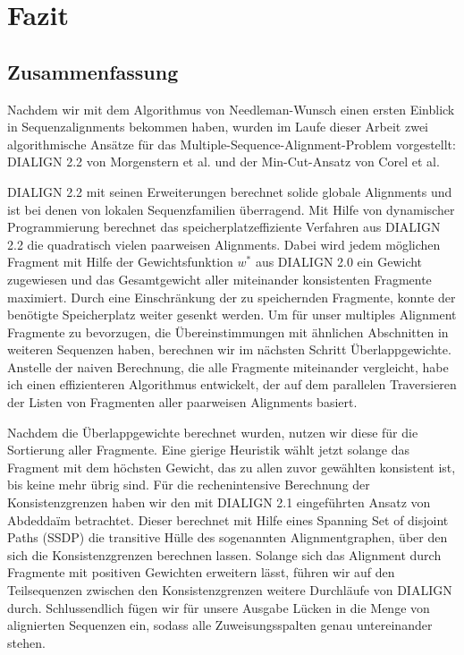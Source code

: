 \chapter{Fazit}
\label{ch:fazit}

\section{Zusammenfassung}

Nachdem wir mit dem Algorithmus von Needleman-Wunsch einen ersten Einblick in Sequenzalignments bekommen haben, wurden im Laufe dieser Arbeit zwei algorithmische Ansätze für das Multiple-Sequence-Alignment-Problem vorgestellt: DIALIGN 2.2 von Morgenstern et al. und der Min-Cut-Ansatz von Corel et al.

DIALIGN 2.2 mit seinen Erweiterungen berechnet solide globale Alignments und ist bei denen von lokalen Sequenzfamilien überragend. Mit Hilfe von dynamischer Programmierung berechnet das speicherplatzeffiziente Verfahren aus DIALIGN 2.2 die quadratisch vielen paarweisen Alignments. Dabei wird jedem möglichen Fragment mit Hilfe der Gewichtsfunktion $w^{*}$ aus DIALIGN 2.0 ein Gewicht zugewiesen und das Gesamtgewicht aller miteinander konsistenten Fragmente maximiert. Durch eine Einschränkung der zu speichernden Fragmente, konnte der benötigte Speicherplatz weiter gesenkt werden. Um für unser multiples Alignment Fragmente zu bevorzugen, die Übereinstimmungen mit ähnlichen Abschnitten in weiteren Sequenzen haben, berechnen wir im nächsten Schritt Überlappgewichte. Anstelle der naiven Berechnung, die alle Fragmente miteinander vergleicht, habe ich einen effizienteren Algorithmus entwickelt, der auf dem parallelen Traversieren der Listen von Fragmenten aller paarweisen Alignments basiert.

Nachdem die Überlappgewichte berechnet wurden, nutzen wir diese für die Sortierung aller Fragmente. Eine gierige Heuristik wählt jetzt solange das Fragment mit dem höchsten Gewicht, das zu allen zuvor gewählten konsistent ist, bis keine mehr übrig sind. Für die rechenintensive Berechnung der Konsistenzgrenzen haben wir den mit DIALIGN 2.1 eingeführten Ansatz von Abdedda\"im betrachtet. Dieser berechnet mit Hilfe eines Spanning Set of disjoint Paths (SSDP) die transitive Hülle des sogenannten Alignmentgraphen, über den sich die Konsistenzgrenzen berechnen lassen.
Solange sich das Alignment durch Fragmente mit positiven Gewichten erweitern lässt, führen wir auf den Teilsequenzen zwischen den Konsistenzgrenzen weitere Durchläufe von DIALIGN durch. Schlussendlich fügen wir für unsere Ausgabe Lücken in die Menge von alignierten Sequenzen ein, sodass alle Zuweisungsspalten genau untereinander stehen.
	
